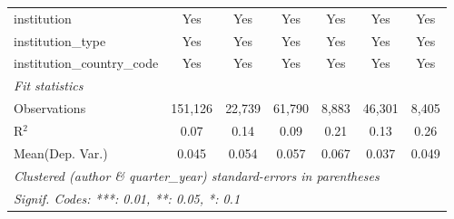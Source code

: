\begin{tabular}{lcccccc}
   institution                  & Yes            & Yes           & Yes            & Yes          & Yes            & Yes\\  
   institution\_type            & Yes            & Yes           & Yes            & Yes          & Yes            & Yes\\  
   institution\_country\_code   & Yes            & Yes           & Yes            & Yes          & Yes            & Yes\\  
   \midrule
   \emph{Fit statistics}\\
   Observations                 & 151,126        & 22,739        & 61,790         & 8,883        & 46,301         & 8,405\\  
   R$^2$                        & 0.07           & 0.14          & 0.09           & 0.21         & 0.13           & 0.26\\  
Mean(Dep. Var.) & 0.045 & 0.054 & 0.057 & 0.067 & 0.037 & 0.049 \\
   \midrule \midrule
   \multicolumn{7}{l}{\emph{Clustered (author \& quarter\_year) standard-errors in parentheses}}\\
   \multicolumn{7}{l}{\emph{Signif. Codes: ***: 0.01, **: 0.05, *: 0.1}}\\
\end{tabular}
\par\endgroup
